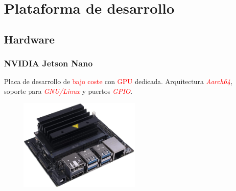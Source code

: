 \documentclass{beamer}
\begin{document}
\section{Plataforma de desarrollo}
\subsection{Hardware}
\begin{frame}
	\frametitle{NVIDIA Jetson Nano}
	\begin{outline}
		\1 Placa de desarrollo de \textcolor{red}{bajo coste} con \textcolor{red}{GPU} dedicada.
		\1 Arquitectura \textcolor{red}{\textit{Aarch64}}, soporte para \textcolor{red}{\textit{GNU/Linux}} y puertos \textcolor{red}{\textit{GPIO}}.
	\end{outline}
	\begin{figure}
		\centering
		\includegraphics[width=6cm]{figs/jetsonnano}
	\end{figure}
\end{frame}
\end{document}
